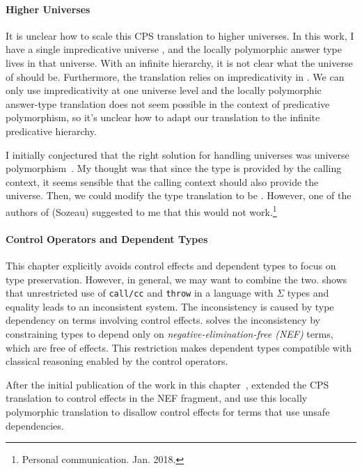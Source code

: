 \paragraph{Higher Universes}
It is unclear how to scale this CPS translation to higher universes.
In this work, I have a single impredicative universe \im{\cpsstarty}, and the
locally polymorphic answer type \im{\cpsalpha} lives in that universe.
With an infinite hierarchy, it is not clear what the universe of \im{\cpsalpha} should be.
Furthermore, the translation relies on impredicativity in \im{\cpsstarty}.
We can only use impredicativity at one universe level and the locally
polymorphic answer-type translation does not seem possible in the context of
predicative polymorphism, so it's unclear how to adapt our translation to the
infinite predicative hierarchy.

I initially conjectured that the right solution for handling universes was
universe polymorphism~\cite{sozeau2014}.
My thought was that since the type is provided by the calling context, it seems
sensible that the calling context should also provide the universe.
Then, we could modify the type translation to be
. 
However, one of the authors of \citeauthor{sozeau2014} (Sozeau) suggested to me
that this would not work.\footnote{Personal communication. Jan. 2018.}

\paragraph{Control Operators and Dependent Types}
This chapter explicitly avoids control effects and dependent types to focus on
type preservation.
However, in general, we may want to combine the two.
\citet{herbelin2005} shows that unrestricted use of \texttt{call/cc} and
\texttt{throw} in a language with \(\Sigma\) types and equality leads to an inconsistent system.
The inconsistency is caused by type dependency on terms involving control effects.
\citet{herbelin2012} solves the inconsistency by constraining types to depend only
on \emph{negative-elimination-free (NEF)} terms, which are free of effects.
This restriction makes dependent types compatible with classical reasoning
enabled by the control operators.

After the initial publication of the work in this
chapter~\cite{bowman2018:cps-sigma}, \citet{cong2018:lam-pi-s-r} extended the
CPS translation to control effects in the NEF fragment, and use this locally
polymorphic translation to disallow control effects for terms that use unsafe dependencies.

